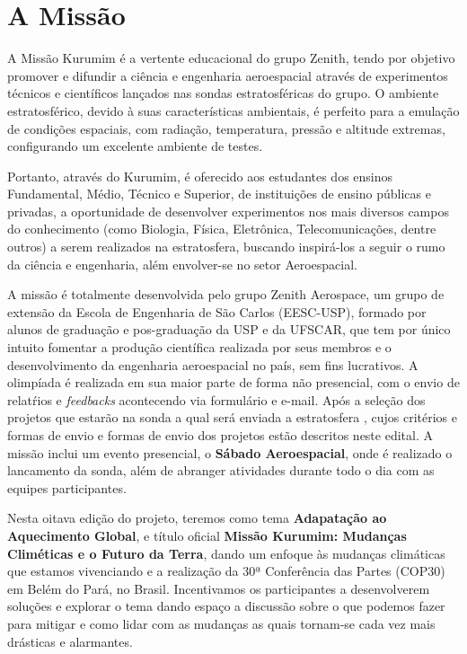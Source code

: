 \section{A Missão}\label{sec:missao}
    \par A Missão Kurumim é a vertente educacional do grupo Zenith, tendo por objetivo promover e difundir a ciência e engenharia aeroespacial através de experimentos técnicos e científicos lançados nas sondas estratosféricas do grupo. O ambiente estratosférico, devido à suas características ambientais, é perfeito para a emulação de condições espaciais, com radiação, temperatura, pressão e altitude extremas, configurando um excelente ambiente de testes.
    
    \par Portanto, através do Kurumim, é oferecido aos estudantes dos ensinos Fundamental, Médio, Técnico e Superior, de instituições de ensino públicas e privadas, a oportunidade de desenvolver experimentos nos mais diversos campos do conhecimento (como Biologia, Física, Eletrônica, Telecomunicações, dentre outros) a serem realizados na estratosfera, buscando inspirá-los a seguir o rumo da ciência e engenharia, além envolver-se no setor Aeroespacial.
    
    \par A missão é totalmente desenvolvida pelo grupo Zenith Aerospace, um grupo de extensão da 
    Escola de Engenharia de São Carlos (EESC-USP), formado por alunos de graduação e pos-graduação da USP
    e da UFSCAR, que tem por único intuito fomentar a produção científica realizada por seus membros e o 
    desenvolvimento da engenharia aeroespacial no país, sem fins lucrativos. 
    A olimpíada é realizada em sua maior parte de forma não presencial, com o envio de relatŕios e \emph{feedbacks}
    acontecendo via formulário e e-mail. Após a seleção dos projetos que estarão na sonda a qual será enviada a estratosfera
    , cujos critérios e formas de envio e formas de envio dos projetos estão descritos neste edital. A missão
    inclui um evento presencial, o \textbf{Sábado Aeroespacial}, onde é realizado o lancamento da sonda, além
    de abranger atividades durante todo o dia com as equipes participantes.
    
    \par Nesta oitava edição do projeto, teremos como tema \textbf{Adapatação ao Aquecimento Global}, 
    e título oficial \textbf{Missão Kurumim: Mudanças Climéticas e o Futuro da Terra}, dando um enfoque
    às mudanças climáticas que estamos vivenciando e a realização da 30ª Conferência das Partes (COP30) em Belém do Pará, no Brasil.
    Incentivamos os participantes a desenvolverem soluções e explorar o tema dando espaço a discussão sobre
    o que podemos fazer para mitigar e como lidar com as mudanças as quais tornam-se cada vez mais drásticas
    e alarmantes.
    
